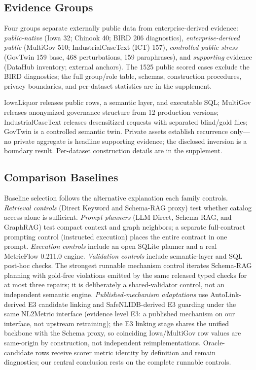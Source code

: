 \documentclass[letterpaper]{article}
\begin{document}
\subsection{Evidence Groups}

Four groups separate externally public data from enterprise-derived evidence: \emph{public-native} (Iowa 32; Chinook 40; BIRD 206 diagnostics), \emph{enterprise-derived public} (MultiGov 510; IndustrialCaseText (ICT) 157), \emph{controlled public stress} (GovTwin 159 base, 468 perturbations, 159 paraphrases), and \emph{supporting} evidence (DataHub inventory; external anchors). The 1525 public scored cases exclude the BIRD diagnostics; the full group/role table, schemas, construction procedures, privacy boundaries, and per-dataset statistics are in the supplement.

IowaLiquor releases public rows, a semantic layer, and executable SQL; MultiGov releases anonymized governance structure from 12 production versions; IndustrialCaseText releases desensitized requests with separated blind/gold files; GovTwin is a controlled semantic twin. Private assets establish recurrence only---no private aggregate is headline supporting evidence; the disclosed inversion is a boundary result. Per-dataset construction details are in the supplement.

\subsection{Comparison Baselines}

Baseline selection follows the alternative explanation each family controls. \emph{Retrieval controls} (Direct Keyword and Schema-RAG proxy) test whether catalog access alone is sufficient. \emph{Prompt planners} (LLM Direct, Schema-RAG, and GraphRAG) test compact context and graph neighbors; a separate full-contract prompting control (instructed execution) places the entire contract in one prompt. \emph{Execution controls} include an open SQLite planner and a real MetricFlow 0.211.0 engine. \emph{Validation controls} include semantic-layer and SQL post-hoc checks. The strongest runnable mechanism control iterates Schema-RAG planning with gold-free violations emitted by the same released typed checks for at most three repairs; it is deliberately a shared-validator control, not an independent semantic engine. \emph{Published-mechanism adaptations} use AutoLink-derived E3 candidate linking and SafeNLIDB-derived E3 guarding under the same NL2Metric interface (evidence level E3: a published mechanism on our interface, not upstream retraining); the E3 linking stage shares the unified backbone with the Schema proxy, so coinciding Iowa/MultiGov row values are same-origin by construction, not independent reimplementations. Oracle-candidate rows receive scorer metric identity by definition and remain diagnostics; our central conclusion rests on the complete runnable controls.
\end{document}
